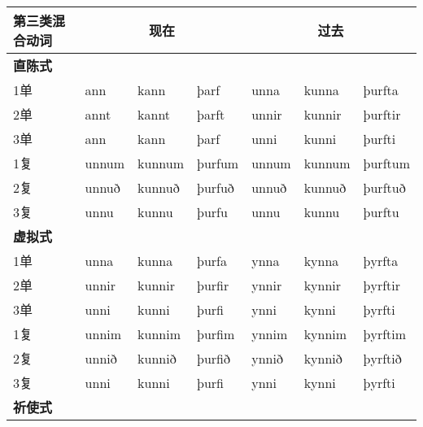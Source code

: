 \begin{longtable}{lllllll}

    \toprule
    第三类混合动词      & \multicolumn{3}{c}{现在} & \multicolumn{3}{c}{过去}                                         \\
    \midrule
    \endhead
    \bottomrule
    \endfoot
    \textbf{直陈式} & ~                      & ~                      & ~        & ~       & ~      & ~       \\
    1单           & ann                    & kann                   & þarf     & unna    & kunna  & þurfta  \\
    2单           & annt                   & kannt                  & þarft    & unnir   & kunnir & þurftir \\
    3单           & ann                    & kann                   & þarf     & unni    & kunni  & þurfti  \\
    1复           & unnum                  & kunnum                 & þurfum   & unnum   & kunnum & þurftum \\
    2复           & unnuð                  & kunnuð                 & þurfuð   & unnuð   & kunnuð & þurftuð \\
    3复           & unnu                   & kunnu                  & þurfu    & unnu    & kunnu  & þurftu  \\
    \textbf{虚拟式} & ~                      & ~                      & ~        & ~       & ~      & ~       \\
    1单           & unna                   & kunna                  & þurfa    & ynna    & kynna  & þyrfta  \\
    2单           & unnir                  & kunnir                 & þurfir   & ynnir   & kynnir & þyrftir \\
    3单           & unni                   & kunni                  & þurfi    & ynni    & kynni  & þyrfti  \\
    1复           & unnim                  & kunnim                 & þurfim   & ynnim   & kynnim & þyrftim \\
    2复           & unnið                  & kunnið                 & þurfið   & ynnið   & kynnið & þyrftið \\
    3复           & unni                   & kunni                  & þurfi    & ynni    & kynni  & þyrfti  \\
    \textbf{祈使式} & ~                      & ~                      & ~        & ~       & ~      & ~       \\

\end{longtable}
